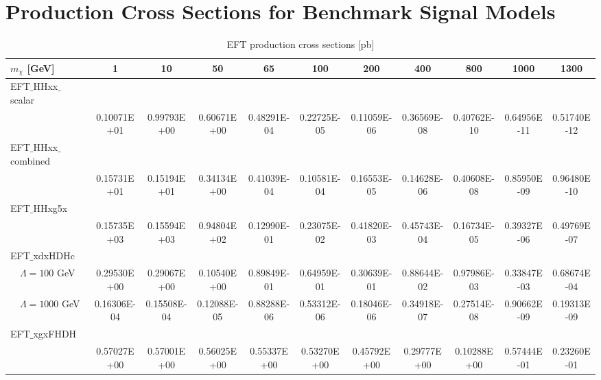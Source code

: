 \chapter{Production Cross Sections for Benchmark Signal Models}

\begin{sidewaystable}[htbH]
\begin{adjustbox}{width=\textwidth,totalheight=\textheight,keepaspectratio}
\label{tab:eftxsecs}
\begin{tabular}{l | c | c | c | c | c | c | c | c | c | c}
\hline 
$m_\chi$ [GeV] & 1 & 10 & 50 & 65 & 100 & 200 & 400 & 800 & 1000 & 1300 \\
\hline
EFT$\_$HHxx$\_$scalar & & & & & & & & & & \\
 & 0.10071E+01 & 0.99793E+00 & 0.60671E+00 & 0.48291E-04 & 0.22725E-05 & 0.11059E-06 & 0.36569E-08 & 0.40762E-10 & 0.64956E-11 & 0.51740E-12 \\
EFT$\_$HHxx$\_$combined & & & & & & & & & & \\
 & 0.15731E+01 & 0.15194E+01 & 0.34134E+00 & 0.41039E-04 & 0.10581E-04 & 0.16553E-05 & 0.14628E-06 & 0.40608E-08 & 0.85950E-09 & 0.96480E-10 \\
EFT$\_$HHxg5x & & & & & & & & & & \\
 & 0.15735E+03 & 0.15594E+03 & 0.94804E+02 & 0.12990E-01 & 0.23075E-02 & 0.41820E-03 & 0.45743E-04 & 0.16734E-05 & 0.39327E-06 & 0.49769E-07 \\
EFT$\_$xdxHDHc & & & & & & & & & & \\
$\quad \Lambda = 100$ GeV & 0.29530E+00 & 0.29067E+00 & 0.10540E+00 & 0.89849E-01 & 0.64959E-01 & 0.30639E-01 & 0.88644E-02 & 0.97986E-03 & 0.33847E-03 & 0.68674E-04 \\
$\quad \Lambda = 1000$ GeV & 0.16306E-04 & 0.15508E-04 & 0.12088E-05 & 0.88288E-06 & 0.53312E-06 & 0.18046E-06 & 0.34918E-07 & 0.27514E-08 & 0.90662E-09 & 0.19313E-09 \\
EFT$\_$xgxFHDH & & & & & & & & & & \\
 & 0.57027E+00 & 0.57001E+00 & 0.56025E+00 & 0.55337E+00 & 0.53270E+00 & 0.45792E+00 & 0.29777E+00 & 0.10288E+00 & 0.57444E-01 & 0.23260E-01 \\
\hline
\end{tabular}
\end{adjustbox}
\caption{EFT production cross sections [pb]}
\end{sidewaystable}

